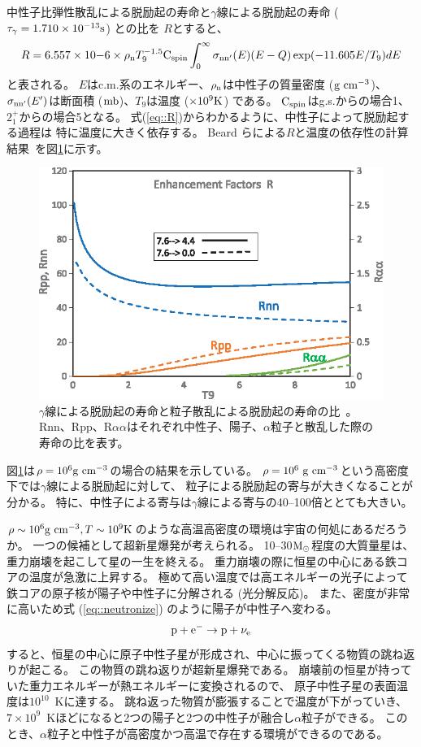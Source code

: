 中性子比弾性散乱による脱励起の寿命と$\gamma$線による脱励起の寿命 ($\tau_{\gamma} = 1.710\times10^{-13} {\rm s}$) との比を
$R$とすると、
\begin{equation}
  R = 6.557\times10{-6}\times\rho_{\rm n}T_{9}^{-1.5}{\rm C}_{{\rm spin}}
  \int^{\infty}_{0}\sigma_{\rm nn'}(E)(E-Q)\exp(-11.605E/T_{9})dE
  \label{eq::R}
\end{equation}
と表される。
$E$はc.m.系のエネルギー、$\rho_{\rm n}$は中性子の質量密度 (${\rm g}~{\rm cm}^{-3}$)、
$\sigma_{\rm nn'}(E')$は断面積 (${\rm mb}$)、$T_{9}$は温度 ($\times10^{9} {\rm K}$) である。
${\rm C}_{{\rm spin}}$はg.s.からの場合1、
$2_{1}^{+}$からの場合5となる。
式(\ref{eq::R})からわかるように、中性子によって脱励起する過程は
特に温度に大きく依存する。
Beard らによる$R$と温度の依存性の計算結果~\cite{hotdensemedium}を図\ref{fig::R}に示す。
\begin{figure}
  \centering
  \includegraphics[clip, width=0.6\columnwidth]{eps/R_T.eps}
  \caption[$\gamma$線による脱励起の寿命と粒子散乱による脱励起の寿命の比。]
          {$\gamma$線による脱励起の寿命と粒子散乱による脱励起の寿命の比~\cite{hotdensemedium}。
    Rnn、Rpp、R$\alpha\alpha$はそれぞれ中性子、陽子、$\alpha$粒子と散乱した際の寿命の比を表す。}
  \label{fig::R}
\end{figure}
図\ref{fig::R}は$\rho = 10^{6}{\rm g}~{\rm cm}^{-3}$の場合の結果を示している。
$\rho = 10^{6}~{\rm g~cm}^{-3}$という高密度下では$\gamma$線による脱励起に対して、
粒子による脱励起の寄与が大きくなることが分かる。
特に、中性子による寄与は$\gamma$線による寄与の40--100倍ととても大きい。

$\rho\sim10^{6}{\rm g~cm^{-3}}, T\sim10^{9}{\rm K}$のような高温高密度の環境は宇宙の何処にあるだろうか。
一つの候補として超新星爆発が考えられる。
10--30$\rm M_{\odot}$程度の大質量星は、重力崩壊を起こして星の一生を終える。
重力崩壊の際に恒星の中心にある鉄コアの温度が急激に上昇する。
極めて高い温度では高エネルギーの光子によって鉄コアの原子核が陽子や中性子に分解される (光分解反応)。
また、密度が非常に高いため式 (\ref{eq::neutronize}) のように陽子が中性子へ変わる。
\begin{equation}
  {\rm p}+{\rm e}^{-} \rightarrow {\rm p}+\nu_{\rm e}
  \label{eq::neutronize}
\end{equation}
すると、恒星の中心に原子中性子星が形成され、中心に振ってくる物質の跳ね返りが起こる。
この物質の跳ね返りが超新星爆発である。
崩壊前の恒星が持っていた重力エネルギーが熱エネルギーに変換されるので、
原子中性子星の表面温度は$10^10$~Kに達する。
跳ね返った物質が膨張することで温度が下がっていき、
$7\times10^9$~Kほどになると2つの陽子と2つの中性子が融合し$\alpha$粒子ができる。
このとき、$\alpha$粒子と中性子が高密度かつ高温で存在する環境ができるのである。

